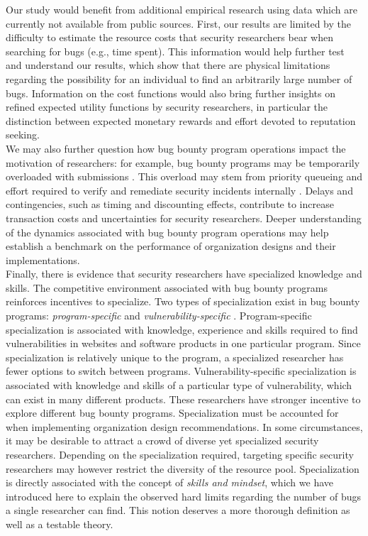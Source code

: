 Our study would benefit from additional empirical research using data which are currently not available from public sources. First, our results are limited by the difficulty to estimate the resource costs that security researchers bear when searching for bugs (e.g., time spent). This information would help further test and understand our results, which show that there are physical limitations regarding the possibility for an individual to find an arbitrarily large number of bugs. Information on the cost functions would also bring further insights on refined expected utility functions by security researchers, in particular the distinction between expected monetary rewards and effort devoted to reputation seeking.\\

We may also further question how bug bounty program operations impact the motivation of researchers: for example, bug bounty programs may be temporarily overloaded with submissions \cite{zhao2014exploratory,zhao2015empirical}. This overload may stem from priority queueing \cite{maillart2011quantification} and effort required to verify and remediate security incidents internally \cite{kuypers2016empirical}. Delays and contingencies, such as timing and discounting effects, contribute to increase transaction costs and uncertainties for security researchers. Deeper understanding of the dynamics associated with bug bounty program operations may help establish a benchmark on the performance of organization designs and their implementations.\\

Finally, there is evidence that security researchers have specialized knowledge and skills. The competitive environment associated with bug bounty programs reinforces incentives to specialize. Two types of specialization exist in bug bounty programs: {\it program-specific} and {\it vulnerability-specific} \cite{zhao2014exploratory,zhao2015empirical}. Program-specific specialization is associated with knowledge, experience and skills required to find vulnerabilities in websites and software products in one particular program. Since specialization is relatively unique to the program, a specialized researcher has fewer options to switch between programs. Vulnerability-specific specialization is associated with knowledge and skills of a particular type of vulnerability, which can exist in many different products. These researchers have stronger incentive to explore different bug bounty programs. Specialization must be accounted for when implementing organization design recommendations. In some circumstances, it may be desirable to attract a crowd of diverse yet specialized security researchers. Depending on the specialization required, targeting specific security researchers may however restrict the diversity of the resource pool. Specialization is directly associated with the concept of {\it skills and mindset}, which we have introduced here to explain the observed hard limits regarding the number of bugs a single researcher can find. This notion deserves a more thorough definition as well as a testable theory.\\





